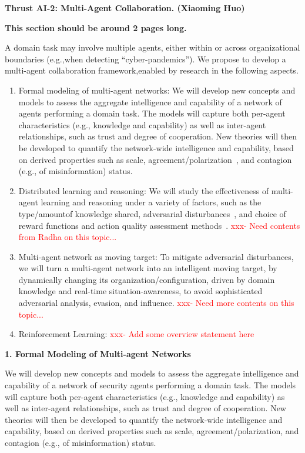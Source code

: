 \documentclass{NSF}
\begin{document}
\setcounter{section}{1}

\noindent \textbf{Thrust AI-2: Multi-Agent Collaboration. (Xiaoming Huo)}

\textbf{This section should be around 2 pages long.}


A domain task may involve multiple agents, either within or across organizational boundaries (e.g.,when detecting ``cyber-pandemics”).
We propose to develop a multi-agent collaboration framework,enabled by research in the following aspects.
\begin{enumerate}
\item Formal modeling of multi-agent networks: 
We will develop new concepts and models to assess the aggregate intelligence and capability of a network of agents performing a domain task.
The models will capture both per-agent characteristics (e.g., knowledge and capability) as well as inter-agent relationships, such as trust and degree of cooperation.
New theories will then be developed to quantify the network-wide intelligence and capability, based on derived properties such as scale, agreement/polarization~\cite{wang22coevolution}, and contagion (e.g., of misinformation) status.

\item 
Distributed learning and reasoning: 
We will study the effectiveness of multi-agent learning and reasoning under a variety of factors, such as the type/amountof knowledge shared, adversarial disturbances~\cite{SilvestreRosaHespanhaSilvestreJun14}, and choice of reward functions and action quality assessment methods~\cite{radha_arel}.
\textcolor{red}{xxx- Need contents from Radha on this topic...}

\item 
Multi-agent network as moving target:
To mitigate adversarial disturbances, we will turn a multi-agent network into an intelligent moving target, by dynamically changing its organization/configuration, driven by domain knowledge and real-time situation-awareness, to avoid sophisticated adversarial analysis, evasion, and influence.
\textcolor{red}{xxx- Need more contents on this topic...}

\item Reinforcement Learning: \textcolor{red}{xxx- Add some overview statement here}
\end{enumerate}



\noindent \textbf{1. Formal Modeling of Multi-agent Networks}

We will develop new concepts and models to assess the aggregate intelligence and capability of a network of security agents performing a domain task.
The models will capture both per-agent characteristics (e.g., knowledge and capability) as well as inter-agent relationships, such as trust and degree of cooperation.
New theories will then be developed to quantify the network-wide intelligence and capability, based on derived properties such as scale, agreement/polarization, and contagion (e.g., of misinformation) status.
\end{document}
